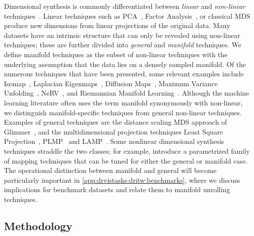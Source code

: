 Dimensional synthesis is commonly differentiated between {\it linear} and {\it non-linear} techniques~\cite{Jain2000}. 
Linear techniques such as \ac{PCA}~\cite{Jolliffe2002}, Factor Analysis~\cite{Child2006}, or classical \ac{MDS} \cite{Torgerson1952,Young1938} produce new dimensions from linear projections of the original data.
Many datasets have an intrinsic structure that can only be revealed using non-linear techniques; these are further divided into {\it general} and {\it manifold} techniques. 
We define manifold techniques as the subset of non-linear techniques with the underlying assumption that the data lies on a densely sampled manifold.  
Of the numerous techniques that have been presented, some relevant examples include Isomap~\cite{Tenenbaum2000}, Laplacian Eigenmaps~\cite{Belkin2001}, Diffusion Maps~\cite{Coifman2005}, Maximum Variance Unfolding~\cite{Sha2005}, NeRV~\cite{Venna2007}, and Riemannian Manifold Learning~\cite{Lin2008}. 
Although the machine learning literature often uses the term manifold synonymously with non-linear, we distinguish manifold-specific techniques from general non-linear techniques. 
Examples of general techniques are the distance scaling MDS approach of Glimmer~\cite{Ingram2009}, and the multidimensional projection techniques Least Square Projection~\cite{Paulovich2008}, PLMP~\cite{Paulovich2010} and LAMP~\cite{Joia2011}. 
Some nonlinear dimensional synthesis techniques straddle the two classes; for example, \citet{Chen2013} introduce a parametrized family of mapping techniques that can be tuned for either the general or manifold case.  
The operational distinction between manifold and general will become particularly important in \autoref{app:drvistasks:dritw:benchmarks}, where we discuss implications for benchmark datasets and relate them to manifold unrolling techniques. 


\subsection{Methodology}
\label{app:drvistasks:dritw:methodology}


